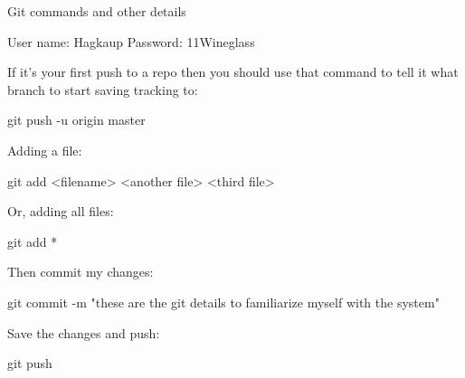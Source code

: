 Git commands and other details

User name: Hagkaup
Password: 11Wineglass


If it’s your first push to a repo then you should use that command to tell it what branch to start saving tracking to:

git push -u origin master


Adding a file:

git add <filename> <another file> <third file>

Or, adding all files:

git add *

Then commit my changes:

git commit -m "these are the git details to familiarize myself with the system"

Save the changes and push:

git push
